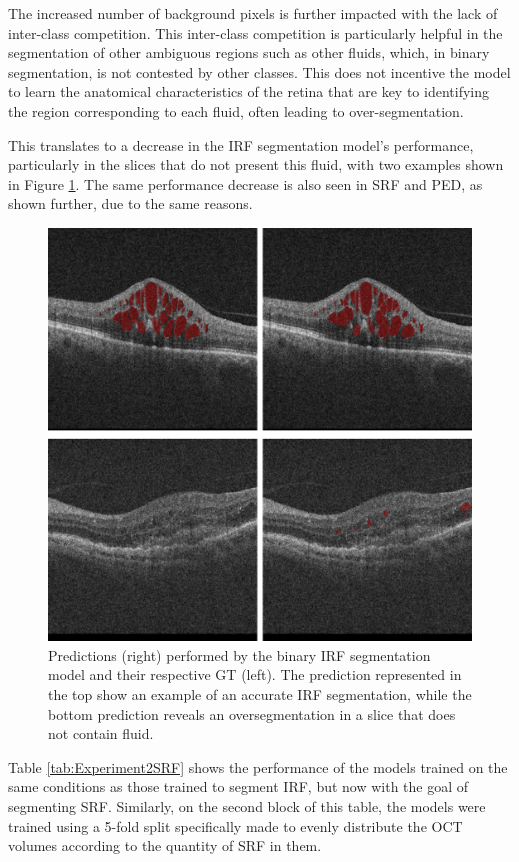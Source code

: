 \par
The increased number of background pixels is further impacted with the lack of inter-class competition. This inter-class competition is particularly helpful in the segmentation of other ambiguous regions such as other fluids, which, in binary segmentation, is not contested by other classes. This does not incentive the model to learn the anatomical characteristics of the retina that are key to identifying the region corresponding to each fluid, often leading to over-segmentation. 
\par
This translates to a decrease in the IRF segmentation model's performance, particularly in the slices that do not present this fluid, with two examples shown in Figure \ref{fig:Experiment2IRFSegmentation}. The same performance decrease is also seen in SRF and PED, as shown further, due to the same reasons.

\begin{figure}[!ht]
	\centering
	\includegraphics[width=0.7\linewidth]{figures/Experiment2IRFSegmentation.png}
	\caption{Predictions (right) performed by the binary IRF segmentation model and their respective GT (left). The prediction represented in the top show an example of an accurate IRF segmentation, while the bottom prediction reveals an oversegmentation in a slice that does not contain fluid.}
	\label{fig:Experiment2IRFSegmentation}
\end{figure}

Table \ref{tab:Experiment2SRF} shows the performance of the models trained on the same conditions as those trained to segment IRF, but now with the goal of segmenting SRF. Similarly, on the second block of this table, the models were trained using a 5-fold split specifically made to evenly distribute the OCT volumes according to the quantity of SRF in them.

